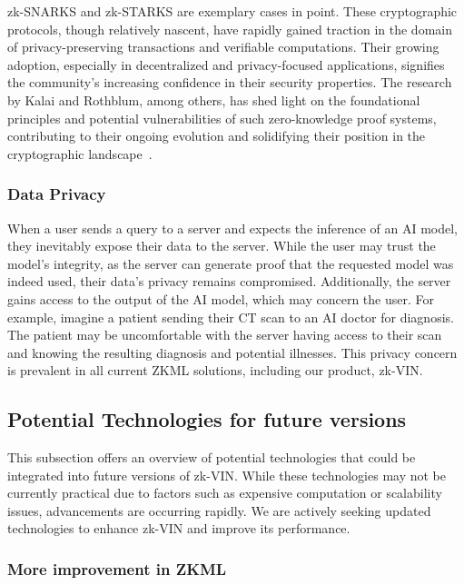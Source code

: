 \documentclass[conference]{IEEEtran}
\begin{document}
zk-SNARKS and zk-STARKS are exemplary cases in point. These cryptographic protocols, though relatively nascent, have rapidly gained traction in the domain of privacy-preserving transactions and veriﬁable computations. Their growing adoption, especially in decentralized and privacy-focused applications, signiﬁes the community’s increasing conﬁdence in their security properties. The research by Kalai and Rothblum, among others, has shed light on the foundational principles and potential vulnerabilities of such zero-knowledge proof systems, contributing to their ongoing evolution and solidifying their position in the cryptographic landscape~\cite{Kalai2017FromOT}.

\subsubsection{Data Privacy}

When a user sends a query to a server and expects the inference of an AI model, they inevitably expose their data to the server. While the user may trust the model's integrity, as the server can generate proof that the requested model was indeed used, their data's privacy remains compromised. Additionally, the server gains access to the output of the AI model, which may concern the user. For example, imagine a patient sending their CT scan to an AI doctor for diagnosis. The patient may be uncomfortable with the server having access to their scan and knowing the resulting diagnosis and potential illnesses. This privacy concern is prevalent in all current ZKML solutions, including our product, zk-VIN.


\subsection{Potential Technologies for future versions}

This subsection offers an overview of potential technologies that could be integrated into future versions of zk-VIN. While these technologies may not be currently practical due to factors such as expensive computation or scalability issues, advancements are occurring rapidly. We are actively seeking updated technologies to enhance zk-VIN and improve its performance.


\subsubsection{More improvement in ZKML}
\end{document}
